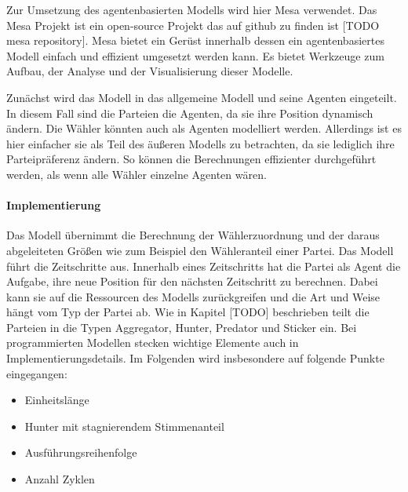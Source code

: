 Zur Umsetzung des agentenbasierten Modells wird hier Mesa \citep{mesa2020} verwendet. Das Mesa Projekt ist ein open-source Projekt das auf github zu finden ist [TODO mesa repository]. 
Mesa bietet ein Gerüst innerhalb dessen ein agentenbasiertes Modell einfach und effizient umgesetzt werden kann. Es bietet Werkzeuge zum Aufbau, der Analyse und der Visualisierung dieser Modelle.

Zunächst wird das Modell in das allgemeine Modell und seine Agenten eingeteilt. In diesem Fall sind die Parteien die Agenten, da sie ihre Position dynamisch ändern. Die Wähler könnten auch als Agenten modelliert werden. Allerdings ist es hier einfacher sie als Teil des äußeren Modells zu betrachten, da sie lediglich ihre Parteipräferenz ändern. So können die Berechnungen effizienter durchgeführt werden, als wenn alle Wähler einzelne Agenten wären.

\paragraph{Implementierung}
Das Modell übernimmt die Berechnung der Wählerzuordnung und der daraus abgeleiteten Größen wie zum Beispiel den Wähleranteil einer Partei. Das Modell führt die Zeitschritte aus. Innerhalb eines Zeitschritts hat die Partei als Agent die Aufgabe, ihre neue Position für den nächsten Zeitschritt zu berechnen. Dabei kann sie auf die Ressourcen des Modells zurückgreifen und die Art und Weise hängt vom Typ der Partei ab. Wie in Kapitel [TODO] beschrieben teilt \citet{laver2005policy} die Parteien in die Typen Aggregator, Hunter, Predator und Sticker ein. Bei programmierten Modellen stecken wichtige Elemente auch in Implementierungsdetails. Im Folgenden wird insbesondere auf folgende Punkte eingegangen:
\begin{itemize}
\item Einheitslänge
\item Hunter mit stagnierendem Stimmenanteil
\item Ausführungsreihenfolge
\item Anzahl Zyklen
\end{itemize}

